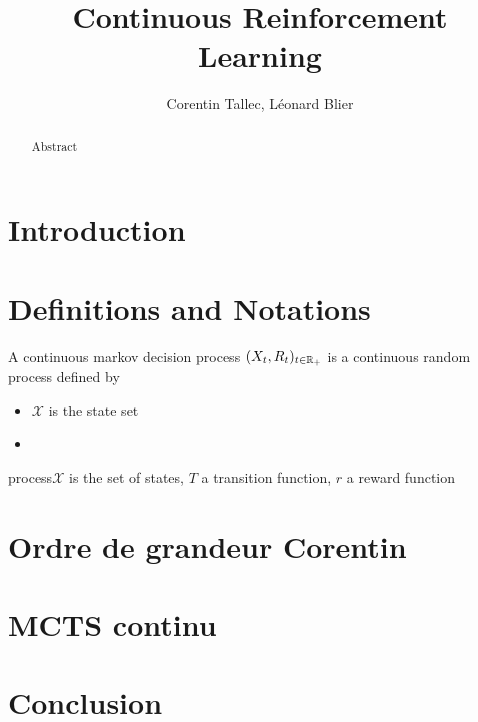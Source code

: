 \documentclass{article}
\title{Continuous Reinforcement Learning}
\author{
  Corentin Tallec, Léonard Blier
}
\begin{document}
\maketitle


\begin{abstract}
Abstract
\end{abstract}



\section{Introduction}
\label{sec:introduction}


\section{Definitions and Notations}
\label{sec:definitions}

\begin{definition}
  A continuous markov decision process $(X_{t}, R_{t})_{t\in\mathbb{R}_{+}}$ is a continuous random process defined by 
  \begin{itemize}
  \item $\mathcal{X}$ is the state set 
  \item 
  \end{itemize}
  process$\mathcal{X}$ is the set of states, $T$ a transition function, $r$ a reward function
\end{definition}


\section{Ordre de grandeur Corentin}
\label{sec:ordre-de-grandeur}

\section{MCTS continu}
\label{sec:mcts-continu}


\section{Conclusion}
\label{sec:conclusion}
\end{document}
